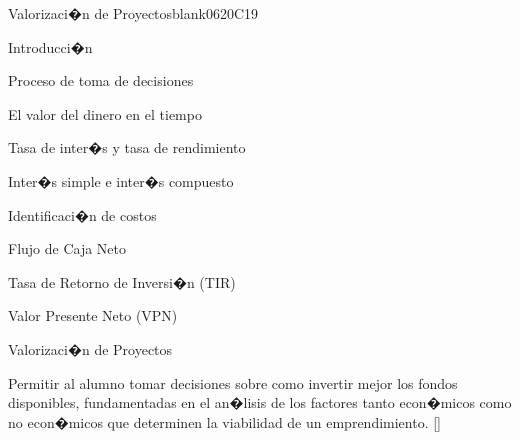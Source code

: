 \begin{syllabus}
\begin{unit}{}{Valorizaci�n de Proyectos}{blank06}{20}{C19}
\begin{topics}
      \item Introducci�n
       \item Proceso de toma de decisiones
       \item El valor del dinero en el tiempo
       \item Tasa de inter�s y tasa de rendimiento
       \item Inter�s simple e inter�s compuesto
       \item Identificaci�n de costos
       \item Flujo de Caja Neto
       \item Tasa de Retorno de Inversi�n (TIR)
      \item Valor Presente Neto (VPN)
       \item Valorizaci�n de Proyectos
   \end{topics}
   \begin{learningoutcomes}
      \item Permitir al alumno tomar decisiones sobre como invertir mejor los fondos disponibles, fundamentadas en el an�lisis de los factores tanto econ�micos como no econ�micos que determinen la viabilidad de un emprendimiento. [\Assessment]
   \end{learningoutcomes}
\end{unit}


\end{syllabus}
